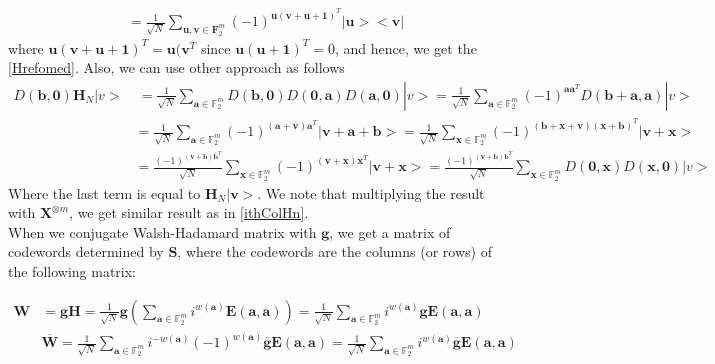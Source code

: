 \documentclass{article}
\begin{document}
{\begin{align*}
		& =  \frac{1}{\sqrt{N}} \sum_{\mathbf{u}, \mathbf{v} \in \mathbf{F}_2^m}{\left(-1\right)^{\mathbf{u} (\mathbf{v+u+1})^T } |\mathbf{u}><\mathbf{v}|}
	\end{align*}
where $\mathbf{u}(\mathbf{v+u+1})^T=\mathbf{u}(\mathbf{v}^T$ since $\mathbf{u}(\mathbf{u+1})^T=0$, and hence, we get the \eqref{Hrefomed}.
		Also, we can use other approach as follows
		\begin{align*}
			D\left(\mathbf{b},\mathbf{0}\right) \mathbf{H}_N |v>& \: = \frac{1}{\sqrt{N}}\sum_{\mathbf{a} \in \mathbb{F}_2^m}{D\left(\mathbf{b},\mathbf{0}\right) D\left(\mathbf{0},\mathbf{a}\right) D\left(\mathbf{a},\mathbf{0}\right)}|v> = \frac{1}{\sqrt{N}}\sum_{\mathbf{a} \in \mathbb{F}_2^m}{(-1)^{\mathbf{a}\mathbf{a}^T} D\left(\mathbf{b}+\mathbf{a},\mathbf{a}\right)}|v> \\
			& = \frac{1}{\sqrt{N}}\sum_{\mathbf{a} \in \mathbb{F}_2^m}{(-1)^{(\mathbf{a+v})\mathbf{a}^T} | \mathbf{v}+\mathbf{a}+\mathbf{b}>}=\frac{1}{\sqrt{N}}\sum_{\mathbf{x} \in \mathbb{F}_2^m}{(-1)^{(\mathbf{b+x+v})(\mathbf{x+b})^T} | \mathbf{v}+\mathbf{x}>} \\
			&=\frac{(-1)^{(\mathbf{v+b})
					\mathbf{b}^T }}{\sqrt{N}}\sum_{\mathbf{x} \in \mathbb{F}_2^m}{(-1)^{(\mathbf{v+x})\mathbf{x}^T} | \mathbf{v}+\mathbf{x}>}=\frac{(-1)^{(\mathbf{v+b})
					\mathbf{b}^T }}{\sqrt{N}}\sum_{\mathbf{x} \in \mathbb{F}_2^m}{D(\mathbf{0, x}) D(\mathbf{x, 0})}|v>
		\end{align*}
		Where the last term is equal to $\mathbf{H}_N | \mathbf{v}>$. We note that multiplying the result with $\mathbf{X}^{\otimes m}$, we get similar result as in \eqref{ithColHn}.
	}
	\\
	
	When we conjugate Walsh-Hadamard matrix with $\mathbf{g}$, we get a matrix of codewords determined by $\mathbf{S}$, where the codewords are the columns (or rows) of the following matrix:
	
	\begin{align*}
		\mathbf{W} &= \mathbf{g}\mathbf{H} = \frac{1}{\sqrt{N}}\mathbf{g}\left(\sum_{\mathbf{a} \in \mathbb{F}^m_2} i^{w(\mathbf{a})}\mathbf{E}(\mathbf{a},\mathbf{a})\right) = \frac{1}{\sqrt{N}}\sum_{\mathbf{a} \in \mathbb{F}^m_2} i^{w(\mathbf{a})}\mathbf{g}\mathbf{E}(\mathbf{a},\mathbf{a}) \\
		&\overline{\mathbf{W}} = \frac{1}{\sqrt{N}}\sum_{\mathbf{a} \in \mathbb{F}^m_2} i^{-w(\mathbf{a})}(-1)^{w(\mathbf{a})}\overline{\mathbf{g}}\mathbf{E}(\mathbf{a},\mathbf{a}) = \frac{1}{\sqrt{N}}\sum_{\mathbf{a} \in \mathbb{F}^m_2} i^{w(\mathbf{a})}\overline{\mathbf{g}}\mathbf{E}(\mathbf{a},\mathbf{a})
	\end{align*}
	
\end{document}
